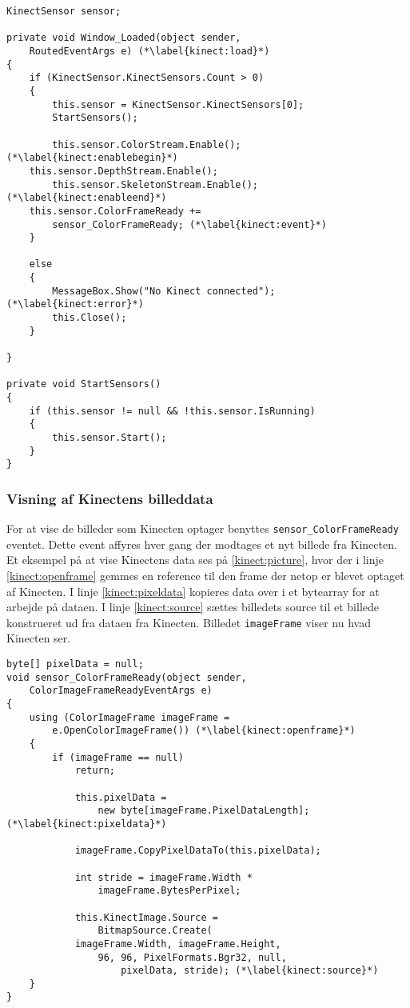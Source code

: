 \begin{lstlisting}[style=csharp, label=kinect:initialisering, caption={Initialisering af en Kinect sensor}]
KinectSensor sensor;

private void Window_Loaded(object sender,
	RoutedEventArgs e) (*\label{kinect:load}*)
{
    if (KinectSensor.KinectSensors.Count > 0)
    {
        this.sensor = KinectSensor.KinectSensors[0];
        StartSensors();
        
        this.sensor.ColorStream.Enable();(*\label{kinect:enablebegin}*)    
	this.sensor.DepthStream.Enable();
        this.sensor.SkeletonStream.Enable();(*\label{kinect:enableend}*)
	this.sensor.ColorFrameReady += 
		sensor_ColorFrameReady; (*\label{kinect:event}*)
    }

    else
    {
        MessageBox.Show("No Kinect connected"); (*\label{kinect:error}*)
        this.Close();
    }

}

private void StartSensors()
{
    if (this.sensor != null && !this.sensor.IsRunning)
    {
        this.sensor.Start();
    }
}
\end{lstlisting}

\subsubsection{Visning af Kinectens billeddata}
For at vise de billeder som Kinecten optager benyttes \lstinline[style=csharp]!sensor_ColorFrameReady! eventet. 
Dette event affyres hver gang der modtages et nyt billede fra Kinecten. 
Et eksempel på at vise Kinectens data ses på \cref{kinect:picture}, hvor der i linje \ref{kinect:openframe} gemmes en reference til den frame der netop er blevet optaget af Kinecten.
I linje \ref{kinect:pixeldata} kopieres data over i et bytearray for at arbejde på dataen. 
I linje \ref{kinect:source} sættes billedets source til et billede konstrueret ud fra dataen fra Kinecten.
Billedet \lstinline[style=csharp]|imageFrame| viser nu hvad Kinecten ser.

\begin{lstlisting}[style=csharp,caption={Visning af billeddata fra Kinectens RGB-kamera}, label=kinect:picture]
byte[] pixelData = null;
void sensor_ColorFrameReady(object sender,
	ColorImageFrameReadyEventArgs e)
{
    using (ColorImageFrame imageFrame = 
    	e.OpenColorImageFrame()) (*\label{kinect:openframe}*)
    {
        if (imageFrame == null)
            return;

            this.pixelData = 
            	new byte[imageFrame.PixelDataLength];(*\label{kinect:pixeldata}*)

            imageFrame.CopyPixelDataTo(this.pixelData);

            int stride = imageFrame.Width *
            	imageFrame.BytesPerPixel;

            this.KinectImage.Source = 
            	BitmapSource.Create(
            imageFrame.Width, imageFrame.Height, 
            	96, 96, PixelFormats.Bgr32, null, 
            		pixelData, stride); (*\label{kinect:source}*)
    }
}    
\end{lstlisting}





